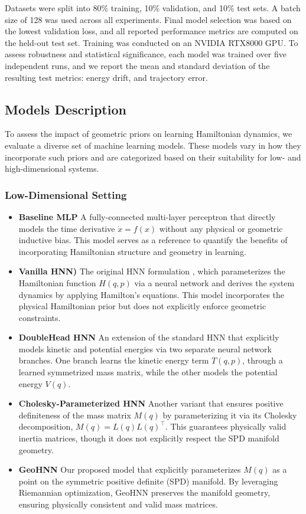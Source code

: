 \documentclass{article}
\theoremstyle{plain}
\theoremstyle{definition}
\theoremstyle{remark}
\begin{document}
Datasets were split into 80\% training, 10\% validation, and 10\% test sets. A batch size of 128 was used across all experiments. Final model selection was based on the lowest validation loss, and all reported performance metrics are computed on the held-out test set. Training was conducted on an NVIDIA RTX8000 GPU. To assess robustness and statistical significance, each model was trained over five independent runs, and we report the mean and standard deviation of the resulting test metrics: energy drift, and trajectory error.

\subsection{Models Description}
To assess the impact of geometric priors on learning Hamiltonian dynamics, we evaluate a diverse set of machine learning models. These models vary in how they incorporate such priors and are categorized based on their suitability for low- and high-dimensional systems.

\subsubsection{Low-Dimensional Setting}

\begin{itemize}
    \item \textbf{Baseline MLP} A fully-connected multi-layer perceptron that directly models the time derivative \(\dot{x} = f(x)\) without any physical or geometric inductive bias. This model serves as a reference to quantify the benefits of incorporating Hamiltonian structure and geometry in learning.
    \item \textbf{Vanilla HNN)} The original HNN formulation \citep{hamiltonian_neural_networks}, which parameterizes the Hamiltonian function \(H(q, p)\) via a neural network and derives the system dynamics by applying Hamilton's equations. This model incorporates the physical Hamiltonian prior but does not explicitly enforce geometric constraints.
    \item \textbf{DoubleHead HNN} An extension of the standard HNN that explicitly models kinetic and potential energies via two separate neural network branches. One branch learns the kinetic energy term \(T(q, p)\), through a learned symmetrized mass matrix, while the other models the potential energy \(V(q)\).
    \item \textbf{Cholesky-Parameterized HNN} Another variant that ensures positive definiteness of the mass matrix \(M(q)\) by parameterizing it via its Cholesky decomposition, \(M(q) = L(q) L(q)^\top\). This guarantees physically valid inertia matrices, though it does not explicitly respect the SPD manifold geometry.
    \item \textbf{GeoHNN} Our proposed model that explicitly parameterizes \(M(q)\) as a point on the symmetric positive definite (SPD) manifold. By leveraging Riemannian optimization, GeoHNN preserves the manifold geometry, ensuring physically consistent and valid mass matrices.
\end{itemize}
\end{document}
